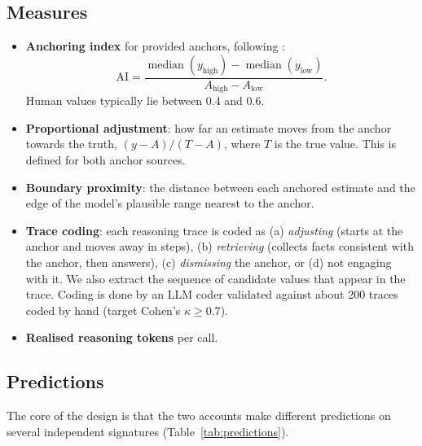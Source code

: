 \documentclass[11pt,a4paper]{article}
\begin{document}
\subsection{Measures}

\begin{itemize}
  \item \textbf{Anchoring index} for provided anchors, following \citet{jacowitz1995measures}:
  \begin{equation}
    \mathrm{AI} = \frac{\operatorname{median}(y_{\text{high}}) - \operatorname{median}(y_{\text{low}})}{A_{\text{high}} - A_{\text{low}}}.
  \end{equation}
  Human values typically lie between 0.4 and 0.6.
  \item \textbf{Proportional adjustment}: how far an estimate moves from the anchor towards the truth, $(y - A)/(T - A)$, where $T$ is the true value. This is defined for both anchor sources.
  \item \textbf{Boundary proximity}: the distance between each anchored estimate and the edge of the model's plausible range nearest to the anchor.
  \item \textbf{Trace coding}: each reasoning trace is coded as (a) \emph{adjusting} (starts at the anchor and moves away in steps), (b) \emph{retrieving} (collects facts consistent with the anchor, then answers), (c) \emph{dismissing} the anchor, or (d) not engaging with it. We also extract the sequence of candidate values that appear in the trace. Coding is done by an LLM coder validated against about 200 traces coded by hand (target Cohen's $\kappa \geq 0.7$).
  \item \textbf{Realised reasoning tokens} per call.
\end{itemize}

\subsection{Predictions}
\label{sec:predictions}

The core of the design is that the two accounts make different predictions on several independent signatures (Table~\ref{tab:predictions}).
\end{document}
